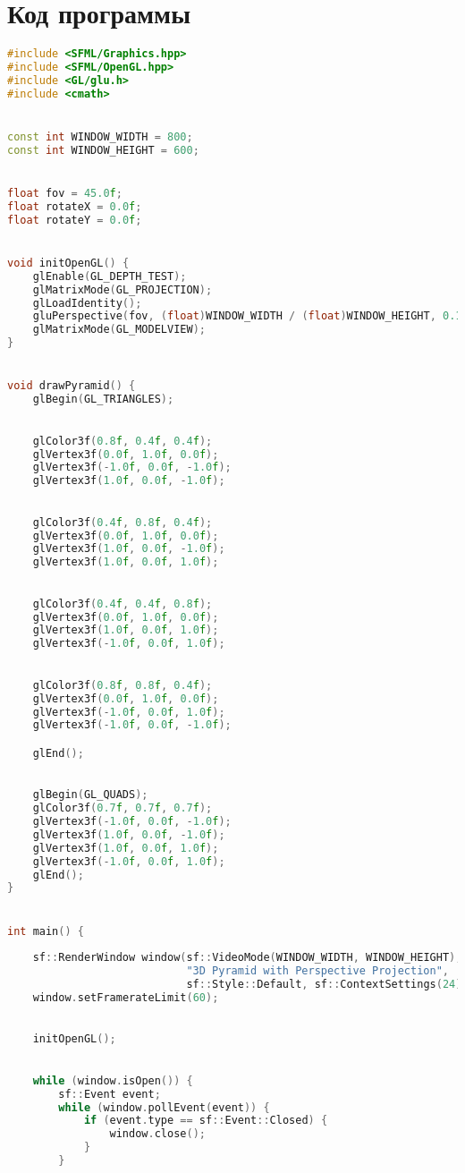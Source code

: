 \section*{Код программы}
\begin{lstlisting}[language=C++]
#include <SFML/Graphics.hpp>
#include <SFML/OpenGL.hpp>
#include <GL/glu.h>
#include <cmath>


const int WINDOW_WIDTH = 800;
const int WINDOW_HEIGHT = 600;


float fov = 45.0f; 
float rotateX = 0.0f; 
float rotateY = 0.0f; 


void initOpenGL() {
    glEnable(GL_DEPTH_TEST); 
    glMatrixMode(GL_PROJECTION);
    glLoadIdentity();
    gluPerspective(fov, (float)WINDOW_WIDTH / (float)WINDOW_HEIGHT, 0.1, 100.0); 
    glMatrixMode(GL_MODELVIEW);
}


void drawPyramid() {
    glBegin(GL_TRIANGLES);

    
    glColor3f(0.8f, 0.4f, 0.4f); 
    glVertex3f(0.0f, 1.0f, 0.0f); 
    glVertex3f(-1.0f, 0.0f, -1.0f); 
    glVertex3f(1.0f, 0.0f, -1.0f); 

    
    glColor3f(0.4f, 0.8f, 0.4f); 
    glVertex3f(0.0f, 1.0f, 0.0f);
    glVertex3f(1.0f, 0.0f, -1.0f);
    glVertex3f(1.0f, 0.0f, 1.0f);

    
    glColor3f(0.4f, 0.4f, 0.8f); 
    glVertex3f(0.0f, 1.0f, 0.0f);
    glVertex3f(1.0f, 0.0f, 1.0f);
    glVertex3f(-1.0f, 0.0f, 1.0f);

    
    glColor3f(0.8f, 0.8f, 0.4f); 
    glVertex3f(0.0f, 1.0f, 0.0f);
    glVertex3f(-1.0f, 0.0f, 1.0f);
    glVertex3f(-1.0f, 0.0f, -1.0f);

    glEnd();

   
    glBegin(GL_QUADS);
    glColor3f(0.7f, 0.7f, 0.7f); 
    glVertex3f(-1.0f, 0.0f, -1.0f);
    glVertex3f(1.0f, 0.0f, -1.0f);
    glVertex3f(1.0f, 0.0f, 1.0f);
    glVertex3f(-1.0f, 0.0f, 1.0f);
    glEnd();
}


int main() {
    
    sf::RenderWindow window(sf::VideoMode(WINDOW_WIDTH, WINDOW_HEIGHT), 
                            "3D Pyramid with Perspective Projection", 
                            sf::Style::Default, sf::ContextSettings(24));
    window.setFramerateLimit(60);

    
    initOpenGL();

    
    while (window.isOpen()) {
        sf::Event event;
        while (window.pollEvent(event)) {
            if (event.type == sf::Event::Closed) {
                window.close();
            }
        }


\end{lstlisting}
